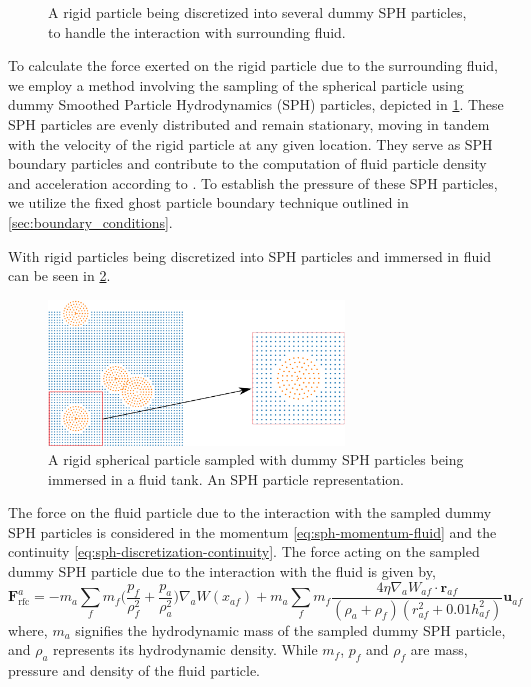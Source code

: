 \documentclass[preprint,12pt]{elsarticle}
\newcommand{\ten}[1]{\ensuremath{\mathbf{#1}}}
\begin{document}
\begin{figure}[!htpb]
\begin{subfigure}{0.24\textwidth}
  \end{subfigure}
  \caption{A rigid particle being discretized into several dummy SPH
    particles, to handle the interaction with surrounding fluid.}
\label{fig:real_particle_sph_sampling}
\end{figure}
To calculate the force exerted on the rigid particle due to the surrounding
fluid, we employ a method involving the sampling of the spherical particle
using dummy Smoothed Particle Hydrodynamics (SPH) particles, depicted in
\cref{fig:real_particle_sph_sampling}. These SPH particles are evenly
distributed and remain stationary, moving in tandem with the velocity of the
rigid particle at any given location.  They serve as SPH boundary particles
and contribute to the computation of fluid particle density and acceleration
according to .
To establish the pressure of these SPH particles, we utilize the fixed ghost
particle boundary technique outlined in \cref{sec:boundary_conditions}.


With rigid particles being discretized into SPH particles and immersed in
fluid can be seen in \cref{fig:many_rb_in_fluid_sph_particles}.
\begin{figure}[!htpb]
  \centering
  \includegraphics[width=0.7\textwidth]{images/rfc_zoomed_combined}
  \caption{A rigid spherical particle sampled with dummy SPH particles being
    immersed in a fluid tank. An SPH particle representation.}
  \label{fig:many_rb_in_fluid_sph_particles}
\end{figure}
The force on the fluid particle due to the
interaction with the sampled dummy SPH particles is considered in the momentum
\cref{eq:sph-momentum-fluid} and the continuity
\cref{eq:sph-discretization-continuity}. The force acting on the sampled dummy
SPH particle due to the interaction with the fluid is given by,
\begin{equation}
  \label{eq:rfc-force}
  \ten{F}_{\text{rfc}}^a = -m_a \sum_{f} m_f \bigg(\frac{p_f}{\rho_{f}^2} +
  \frac{p_a}{\rho_{a}^2}\bigg) \nabla_{a} W(x_{af}) +
  m_a \sum_{f} m_f \frac{4 \eta \nabla_a W_{af}\cdot
    \ten{r}_{af}}{(\rho_a + \rho_f) (r_{af}^2 + 0.01 h_{af}^2)} \ten{u}_{af}
\end{equation}
where, $m_a$ signifies the hydrodynamic mass of the sampled dummy SPH particle,
and $\rho_a$ represents its hydrodynamic density. While $m_f$, $p_f$ and
$\rho_f$ are mass, pressure and density of the fluid particle.
\end{document}
